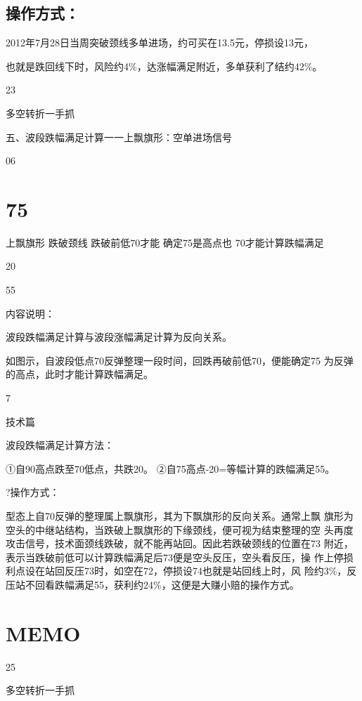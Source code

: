 \documentclass{article}
\begin{document}
\subsection{操作方式：}

2012年7月28日当周突破颈线多单进场，约可买在13.5元，停损设13元，

也就是跌回线下时，风险约4\%，达涨幅满足附近，多单获利了结约42\%。

23

\clearpage

多空转折一手抓

五、波段跌幅满足计算一一上飘旗形：空单进场信号

06

\section{75}

上飘旗形 跌破颈线 跌破前低70才能 确定75是高点也 70才能计算跌幅满足

20

55

内容说明：

波段跌幅满足计算与波段涨幅满足计算为反向关系。

如图示，自波段低点70反弹整理一段时间，回跌再破前低70，便能确定75 为反弹的高点，此时才能计算跌幅满足。

7

\clearpage

技术篇

波段跌幅满足计算方法：

①自90高点跌至70低点，共跌20。 ②自75高点-20=等幅计算的跌幅满足55。

?操作方式：

型态上自70反弹的整理属上飘旗形，其为下飘旗形的反向关系。通常上飘 旗形为空头的中继站结构，当跌破上飘旗形的下缘颈线，便可视为结束整理的空 头再度攻击信号，技术面颈线跌破，就不能再站回。因此若跌破颈线的位置在73 附近，表示当跌破前低可以计算跌幅满足后73便是空头反压，空头看反压，操 作上停损利点设在站回反压73时，如空在72，停损设74也就是站回线上时，风 险约3\%，反压站不回看跌幅满足55，获利约24\%，这便是大赚小赔的操作方式。

\section{MEMO}

25

\clearpage

多空转折一手抓
\end{document}

